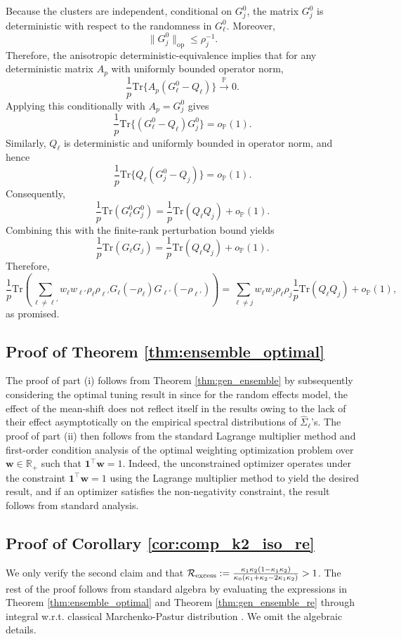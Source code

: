 \documentclass{article}
\theoremstyle{plain}
\theoremstyle{remark}
\def \tr {\mathrm{Tr}}
\def \P{\mathbb{P}}
\begin{document}
Because the clusters are independent, conditional on \(G_j^0\), the matrix \(G_j^0\) is deterministic with respect to the randomness in \(G_\ell^0\). Moreover,
\[
\|G_j^0\|_{\mathrm{op}}\leq \rho_j^{-1}.
\]
Therefore, the anisotropic deterministic-equivalence \citep{knowles2017anisotropic} implies that for any deterministic matrix \(A_p\) with uniformly bounded operator norm,
\[
\frac{1}{p}\tr\{A_p(G_\ell^0-Q_\ell)\}
\stackrel{\P}{\to} 0.
\]
Applying this conditionally with \(A_p=G_j^0\) gives
\[
\frac{1}{p}\tr\{(G_\ell^0-Q_\ell)G_j^0\}
=
o_{\P}(1).
\]
Similarly, \(Q_\ell\) is deterministic and uniformly bounded in operator norm, and hence
\[
\frac{1}{p}\tr\{Q_\ell(G_j^0-Q_j)\}
=
o_{\P}(1).
\]
Consequently,
\[
\frac{1}{p}\tr(G_\ell^0G_j^0)
=
\frac{1}{p}\tr(Q_\ell Q_j)
+
o_{\P}(1).
\]
Combining this with the finite-rank perturbation bound yields
\[
\frac{1}{p}\tr(G_\ell G_j)
=
\frac{1}{p}\tr(Q_\ell Q_j)
+
o_{\P}(1).
\]
Therefore,
\[
\frac{1}{p}\tr(\sum_{\ell\neq \ell'} w_{\ell}w_{\ell'}\rho_{\ell}\rho_{\ell'}G_{\ell}(-\rho_{\ell})G_{\ell'}(-\rho_{\ell'}))
=
\sum_{\ell\neq j}
w_\ell w_j\rho_\ell\rho_j
\frac{1}{p}\tr(Q_\ell Q_j)
+
o_{\P}(1),
\]
as promised.

\subsection{Proof of Theorem \ref{thm:ensemble_optimal}}
The proof of part (i) follows from Theorem \ref{thm:gen_ensemble} by subsequently considering the optimal tuning result in \cite{dobriban2018high} since for the random effects model, the effect of the mean-shift does not reflect itself in the results owing to the lack of their effect asymptotically on the empirical spectral distributions of $\hat{\Sigma}_{\ell}$'s. The proof of part (ii) then follows from the standard Lagrange multiplier method and first-order condition analysis of the optimal weighting optimization problem over $\mathbf{w}\in \mathbb{R}_+$ such that $\mathbf{1}^\top\mathbf{w}=1$. Indeed, the unconstrained optimizer operates under the constraint $\mathbf{1}^\top\mathbf{w}=1$ using the Lagrange multiplier method to yield the desired result, and if an optimizer satisfies the non-negativity constraint, the result follows from standard analysis. 

\subsection{Proof of Corollary \ref{cor:comp_k2_iso_re}} We only verify the second claim and that $\mathcal{R}_{\rm excess}:=\frac{\kappa_1\kappa_2(1-\kappa_1\kappa_2)}
      {\kappa_0(\kappa_1+\kappa_2-2\kappa_1\kappa_2)}>1$.
The rest of the proof follows from standard algebra by evaluating the expressions in Theorem \ref{thm:ensemble_optimal} and Theorem \ref{thm:gen_ensemble_re} through integral w.r.t. classical Marchenko-Pastur distribution \citep[Section 3.1.1]{bai2010spectral}. We omit the algebraic details.
\end{document}
